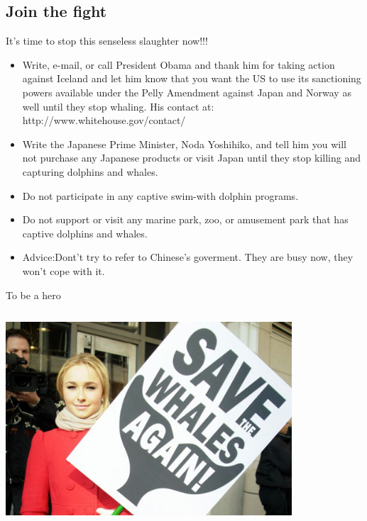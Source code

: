 \documentclass[hyperref={unicode}]{beamer}
\begin{document}
\begin{CJK}{UTF8}{gkai}
\section{Join the fight}
\begin{frame}{It's time to stop this senseless slaughter now!!!}
\begin{itemize}
\item Write, e-mail, or call \alert{President Obama} and thank him for taking action against Iceland and let him know that you want the US to use its sanctioning powers available under the Pelly Amendment against Japan and Norway as well until they stop whaling. His contact at: \alert{http://www.whitehouse.gov/contact/} 
\pause
\item Write the Japanese Prime Minister, \alert{Noda Yoshihiko}, and tell him you will not purchase any Japanese products or visit Japan until they stop killing and capturing dolphins and whales.
\pause
\item Do not \alert{participate} in any captive swim-with dolphin programs.
\pause
\item Do not support or \alert{visit} any marine park, zoo, or amusement park that has captive dolphins and whales.
\pause
\item \alert{Advice}:Dont't try to refer to Chinese's goverment. They are busy now, they won't cope with it.
\end{itemize}
\end{frame}
\begin{frame}{To be a hero}
\begin{columns}
\begin{column}{0.5\textwidth}
  \begin{center}
  \includegraphics[width=0.8\textwidth]{save_the_whale}
  \end{center}
\end{column}


\end{columns}
\end{frame}
\end{CJK}
\end{document}
